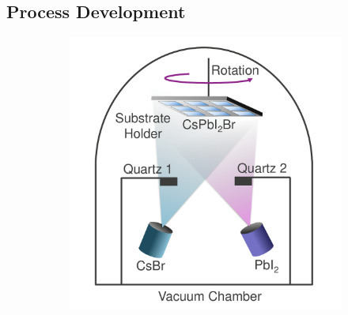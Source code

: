 \subsection{Process Development}

\begin{figure}[htbp]
    \centering
    \begin{subfigure}[t]{0.49\textwidth} %
        \centering
        \includegraphics[width=\textwidth]{chapters/material_properties/images/Chamber.pdf} %
        \caption{}
        \label{}
    \end{subfigure}
    \hfill %
    \begin{subfigure}[t]{0.49\textwidth} %
        \centering        
        \caption{}
        \label{}
    \end{subfigure}


\end{figure}
